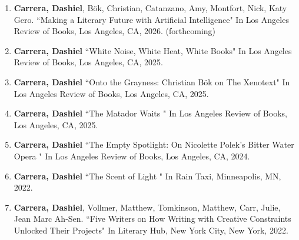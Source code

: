 \begin{enumerate}
\item \textbf{Carrera, Dashiel}, B\"ok, Christian, Catanzano, Amy, Montfort, Nick, Katy Gero. ``Making a Literary Future with Artificial Intelligence" In Los Angeles Review of Books, Los Angeles, CA, 2026. (forthcoming)\\

\item \textbf{Carrera, Dashiel} ``White Noise, White Heat, White Books" In Los Angeles Review of Books, Los Angeles, CA, 2025.\\

\item \textbf{Carrera, Dashiel} ``Onto the Grayness: Christian B\"ok on The Xenotext" In Los Angeles Review of Books, Los Angeles, CA, 2025.\\

\item \textbf{Carrera, Dashiel} ``The Matador Waits " In Los Angeles Review of Books, Los Angeles, CA, 2025.\\

\item \textbf{Carrera, Dashiel} ``The Empty Spotlight: On Nicolette Polek's Bitter Water Opera " In Los Angeles Review of Books, Los Angeles, CA, 2024.\\

\item \textbf{Carrera, Dashiel} ``The Scent of Light " In Rain Taxi, Minneapolis, MN, 2022.\\
%
\item \textbf{Carrera, Dashiel}, Vollmer, Matthew, Tomkinson, Matthew, Carr, Julie, Jean Marc Ah-Sen. ``Five Writers on How Writing with Creative Constraints Unlocked Their Projects" In Literary Hub, New York City, New York, 2022.\\


\end{enumerate}
